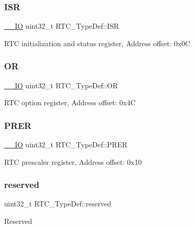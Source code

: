 \subsubsection{\texorpdfstring{ISR}{ISR}}
{\footnotesize\ttfamily \mbox{\hyperlink{core__sc300_8h_aec43007d9998a0a0e01faede4133d6be}{\+\_\+\+\_\+\+IO}} uint32\+\_\+t R\+T\+C\+\_\+\+Type\+Def\+::\+I\+SR}

R\+TC initialization and status register, Address offset\+: 0x0C \mbox{\label{struct_r_t_c___type_def_ac4ec213226146fa48aa9b29e0e80b3ad}} 
\subsubsection{\texorpdfstring{OR}{OR}}
{\footnotesize\ttfamily \mbox{\hyperlink{core__sc300_8h_aec43007d9998a0a0e01faede4133d6be}{\+\_\+\+\_\+\+IO}} uint32\+\_\+t R\+T\+C\+\_\+\+Type\+Def\+::\+OR}

R\+TC option register, Address offset\+: 0x4C \mbox{\label{struct_r_t_c___type_def_a5f43a11e0873212f598e41db5f2dcf6a}} 
\subsubsection{\texorpdfstring{PRER}{PRER}}
{\footnotesize\ttfamily \mbox{\hyperlink{core__sc300_8h_aec43007d9998a0a0e01faede4133d6be}{\+\_\+\+\_\+\+IO}} uint32\+\_\+t R\+T\+C\+\_\+\+Type\+Def\+::\+P\+R\+ER}

R\+TC prescaler register, Address offset\+: 0x10 \mbox{\label{struct_r_t_c___type_def_a379f2d857bff7db82470fffaeca381bd}} 
\subsubsection{\texorpdfstring{reserved}{reserved}}
{\footnotesize\ttfamily uint32\+\_\+t R\+T\+C\+\_\+\+Type\+Def\+::reserved}

Reserved \mbox{\label{struct_r_t_c___type_def_a6082856c9191f5003b6163c0d3afcaff}} 
